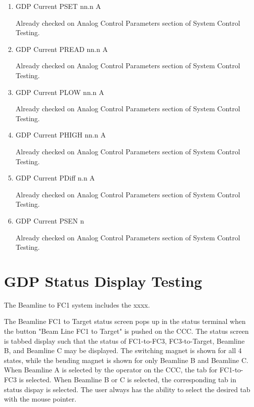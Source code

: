 \documentclass[11pt]{book}		%
\begin{document}
\begin{enumerate}
 \item GDP Current PSET   nn.n A

\color{red}
Already checked on Analog Control Parameters section of System Control Testing.
\color{black}

 \item GDP Current PREAD  nn.n A

\color{red}
Already checked on Analog Control Parameters section of System Control Testing.
\color{black}

 \item GDP Current PLOW   nn.n A

\color{red}
Already checked on Analog Control Parameters section of System Control Testing.
\color{black}

 \item GDP Current PHIGH  nn.n A

\color{red}
Already checked on Analog Control Parameters section of System Control Testing.
\color{black}

 \item GDP Current PDiff n.n A

\color{red}
Already checked on Analog Control Parameters section of System Control Testing.
\color{black}

 \item GDP Current PSEN  n

\color{red}
Already checked on Analog Control Parameters section of System Control Testing.
\color{black}

\end{enumerate}






\chapter{GDP Status Display Testing}

The Beamline to FC1 system includes the xxxx.

The Beamline FC1 to Target status screen pops up in the status terminal when the button "Beam Line FC1 to Target" is pushed on the CCC. The status screen is tabbed display such that the status of FC1-to-FC3, FC3-to-Target, Beamline B, and Beamline C may be displayed.  The switching magnet is shown for all 4 states, while the bending magnet is shown for only Beamline B and Beamline C.  When Beamline A is selected by the operator on the CCC, the tab for FC1-to-FC3 is selected. When Beamline B or C is selected, the corresponding tab in status dispay is selected. The user always has the ability to select the desired tab with the mouse pointer.
\end{document}
